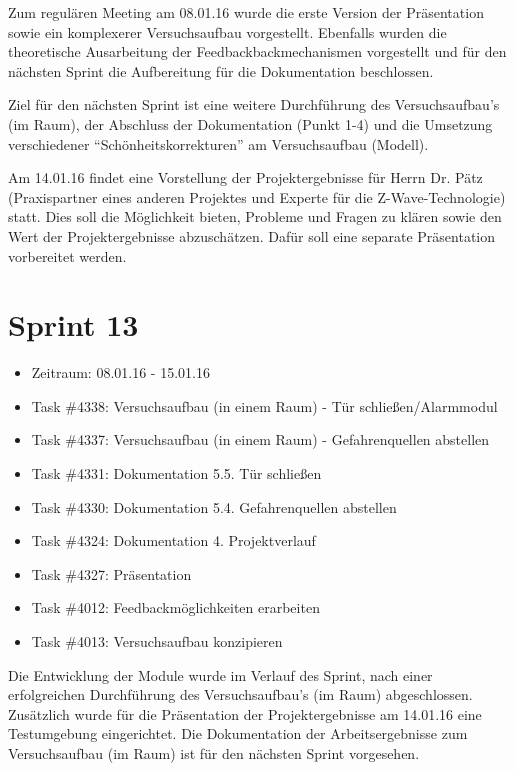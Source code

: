 \documentclass[12pt, oneside, smallheadings]{scrbook}
\begin{document}
Zum regulären Meeting am 08.01.16 wurde die erste Version der Präsentation sowie ein komplexerer Versuchsaufbau vorgestellt. Ebenfalls wurden die theoretische Ausarbeitung der Feedbackbackmechanismen vorgestellt und für den nächsten Sprint die Aufbereitung für die Dokumentation beschlossen.

Ziel für den nächsten Sprint ist eine weitere Durchführung des Versuchsaufbau's (im Raum), der Abschluss der Dokumentation (Punkt 1-4) und die Umsetzung verschiedener "`Schönheitskorrekturen"' am Versuchsaufbau (Modell). 

Am 14.01.16 findet eine Vorstellung der Projektergebnisse für Herrn Dr. Pätz (Praxispartner eines anderen Projektes und Experte für die Z-Wave-Technologie) statt. Dies soll die Möglichkeit bieten, Probleme und Fragen zu klären sowie den Wert der Projektergebnisse abzuschätzen. Dafür soll eine separate Präsentation vorbereitet werden.

\section{Sprint 13}
\begin{itemize}
	\item Zeitraum: 08.01.16 - 15.01.16 \newline
	\item Task \#4338: Versuchsaufbau (in einem Raum) - Tür schließen/Alarmmodul
	\item Task \#4337: Versuchsaufbau (in einem Raum) - Gefahrenquellen abstellen
	\item Task \#4331: Dokumentation 5.5. Tür schließen
	\item Task \#4330: Dokumentation 5.4. Gefahrenquellen abstellen
	\item Task \#4324: Dokumentation 4. Projektverlauf
	\item Task \#4327: Präsentation
	\item Task \#4012: Feedbackmöglichkeiten erarbeiten
	\item Task \#4013: Versuchsaufbau konzipieren\\
\end{itemize}
\noindent
Die Entwicklung der Module wurde im Verlauf des Sprint, nach einer erfolgreichen Durchführung des Versuchsaufbau's (im Raum) abgeschlossen. Zusätzlich wurde für die Präsentation der Projektergebnisse am 14.01.16 eine Testumgebung eingerichtet. Die Dokumentation der Arbeitsergebnisse zum Versuchsaufbau (im Raum) ist für den nächsten Sprint vorgesehen.
\end{document}
